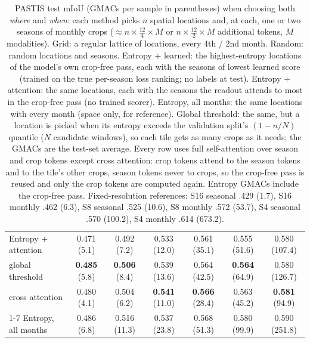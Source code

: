 \begin{table}[t]
\begin{tabular}{lcccccc}
Entropy + attention & 0.471 {\scriptsize(5.1)} & 0.492 {\scriptsize(7.2)} & 0.533 {\scriptsize(12.0)} & 0.561 {\scriptsize(35.1)} & 0.555 {\scriptsize(51.6)} & 0.580 {\scriptsize(107.4)} \\
\quad global threshold & \textbf{0.485} {\scriptsize(5.8)} & \textbf{0.506} {\scriptsize(8.4)} & 0.539 {\scriptsize(13.6)} & 0.564 {\scriptsize(42.5)} & \textbf{0.564} {\scriptsize(64.9)} & 0.580 {\scriptsize(126.7)} \\
\quad\quad cross attention & 0.480 {\scriptsize(4.1)} & 0.504 {\scriptsize(6.2)} & \textbf{0.541} {\scriptsize(11.0)} & \textbf{0.566} {\scriptsize(28.4)} & 0.563 {\scriptsize(45.2)} & \textbf{0.581} {\scriptsize(94.9)} \\
\cmidrule(lr){1-7}
Entropy, all months & 0.486 {\scriptsize(6.8)} & 0.516 {\scriptsize(11.3)} & 0.537 {\scriptsize(23.8)} & 0.568 {\scriptsize(51.3)} & 0.580 {\scriptsize(99.9)} & 0.590 {\scriptsize(251.8)} \\
\bottomrule
\end{tabular}
\caption{PASTIS test mIoU (GMACs per sample in parentheses) when choosing both \emph{where} and \emph{when}: each method picks $n$ spatial locations and, at each, one or two seasons of monthly crops ($\approx n \times \frac{12}{4} \times M$ or $n \times \frac{12}{2} \times M$ additional tokens, $M$ modalities). Grid: a regular lattice of locations, every 4th / 2nd month. Random: random locations and seasons. Entropy + learned: the highest-entropy locations of the model's own crop-free pass, each with the seasons of lowest learned score (trained on the true per-season loss ranking; no labels at test). Entropy + attention: the same locations, each with the seasons the readout attends to most in the crop-free pass (no trained scorer). Entropy, all months: the same locations with every month (space only, for reference). Global threshold: the same, but a location is picked when its entropy exceeds the validation split's $(1 - n / N)$ quantile ($N$ candidate windows), so each tile gets as many crops as it needs; the GMACs are the test-set average. Every row uses full self-attention over season and crop tokens except cross attention: crop tokens attend to the season tokens and to the tile's other crops, season tokens never to crops, so the crop-free pass is reused and only the crop tokens are computed again. Entropy GMACs include the crop-free pass. Fixed-resolution references: S16 seasonal .429 (1.7), S16 monthly .462 (6.3), S8 seasonal .525 (10.6), S8 monthly .572 (53.7), S4 seasonal .570 (100.2), S4 monthly .614 (673.2).}
\label{tab:spacetime}
\end{table}
